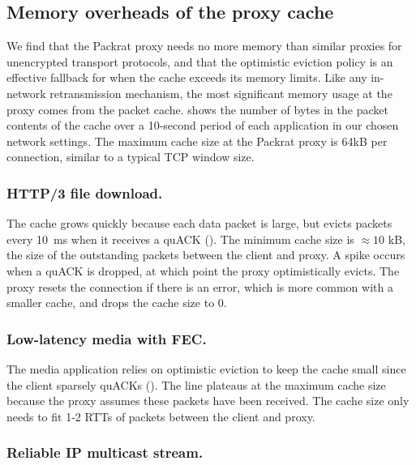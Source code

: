 
\subsection{Memory overheads of the proxy cache}
\label{sec:packrat:emulation:memory-overheads}



We find that the Packrat proxy needs no more memory
than similar proxies for unencrypted transport protocols, and that the optimistic
eviction policy is an effective fallback for when the cache exceeds its memory limits.
Like any in-network retransmission mechanism,
the most significant memory usage at the proxy comes from the packet
cache.  shows the number of bytes in the packet contents of
the cache over a 10-second period of each application in our chosen
network settings. The maximum cache size
at the Packrat proxy is 64kB per connection, similar to a typical TCP window size.

\subsubsection{HTTP/3 file download.}

The cache grows quickly because each data packet is large, but evicts
packets every 10~ms when
it receives a quACK (). The minimum cache size is
$\approx\!10$ kB, the size of the outstanding packets between the client and
proxy. A spike occurs when a quACK is dropped, at which point the proxy
optimistically evicts. The proxy resets the connection if there is an
error, which is more common with a smaller cache, and drops the cache
size to 0.

\subsubsection{Low-latency media with FEC.}

The media application relies on optimistic eviction to keep the cache small
since the client sparsely quACKs (). The
line plateaus at the maximum cache size because the proxy
assumes these packets have been received. The cache size only needs to fit 1-2
RTTs of packets between the client and proxy.

\subsubsection{Reliable IP multicast stream.}

